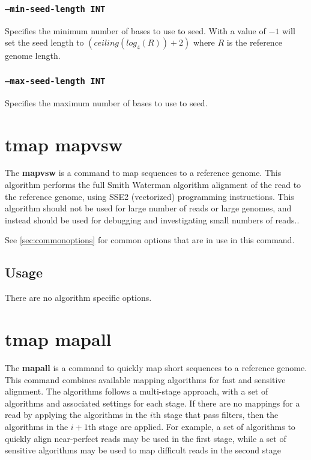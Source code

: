 \documentclass[a4paper,12pt]{book}
\newcommand{\TT}[1]{{\tt #1}} %
\newcommand{\BF}[1]{{\bf #1}} %
\begin{document}
\subsubsection{\TT{--min-seed-length INT}}
Specifies the minimum number of bases to use to seed.
With a value of $-1$ will set the seed length to $\left(ceiling(log_4(R)) + 2\right)$ where $R$ is the reference genome length.

\subsubsection{\TT{--max-seed-length INT}}
Specifies the maximum number of bases to use to seed.

\section{tmap mapvsw}
\label{sec:mapvsw}
The \BF{mapvsw} is a command to map sequences to a reference genome.
This algorithm performs the full Smith Waterman algorithm alignment of the read to the reference genome, using SSE2 (vectorized) programming instructions.
This algorithm should not be used for large number of reads or large genomes, and instead should be used for debugging and investigating small numbers of reads..

See \autoref{sec:commonoptions} for common options that are in use in this command.

\subsection{Usage}
There are no algorithm specific options.

\section{tmap mapall}
\label{sec:mapall}
The \BF{mapall} is a command to quickly map short sequences to a reference genome.
This command combines available mapping algorithms for fast and sensitive alignment.
The algorithms follows a multi-stage approach, with a set of algorithms and associated settings for each stage.
If there are no mappings for a read by applying the algorithms in the $i$th stage that pass filters, then the algorithms in the $i+1$th stage are applied. 
For example, a set of algorithms to quickly align near-perfect reads may be used in the first stage, while a set of sensitive algorithms may be used to map difficult reads in the second stage
\end{document}
